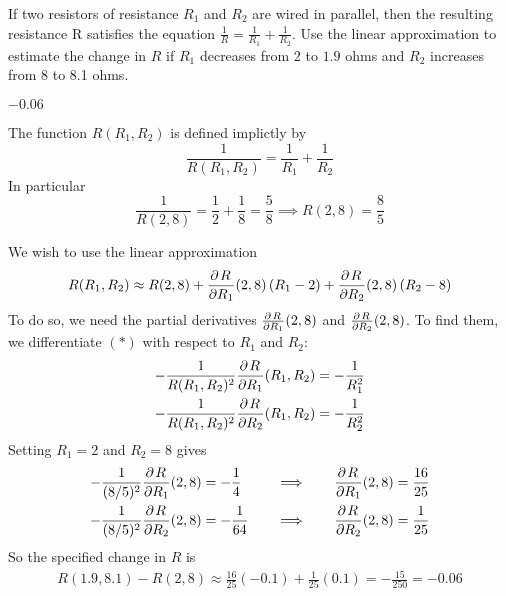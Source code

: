 \begin{question}[M200 2006A] %
If two resistors of resistance $R_1$ and $R_2$ are wired in parallel, 
then the resulting resistance R satisfies the equation
$\frac{1}{R} =\frac{1}{R_1}+\frac{1}{R_2}$. Use the linear
approximation to estimate the change in $R$ if $R_1$ decreases from 
$2$ to $1.9$ ohms and $R_2$ increases from 8 to 8.1 ohms.
\end{question}

%

\begin{answer}
$-0.06$
\end{answer}

\begin{solution}
The function $R(R_1,R_2)$ is defined implictly by
\begin{equation*}
\frac{1}{R(R_1,R_2)} =\frac{1}{R_1}+\frac{1}{R_2}
\tag{$*$}\end{equation*}
In particular
\begin{equation*}
\frac{1}{R(2,8)} = \frac{1}{2}+\frac{1}{8} = \frac{5}{8}
\implies R(2,8) = \frac{8}{5}
\end{equation*}

We wish to use the linear approximation
\begin{equation*}
R(R_1,R_2) \approx R(2,8) + \pdiff{R}{R_1}(2,8)\,(R_1-2)
                          + \pdiff{R}{R_2}(2,8)\,(R_2-8)
\end{equation*}
To do so, we need the partial derivatives $\pdiff{R}{R_1}(2,8)$
and $\pdiff{R}{R_2}(2,8)$. To find them, we differentiate $(*)$ with respect to
$R_1$ and $R_2$:
\begin{align*}
-\frac{1}{R(R_1,R_2)^2}\pdiff{R}{R_1}(R_1,R_2)
                 &= -\frac{1}{R_1^2}  \\
-\frac{1}{R(R_1,R_2)^2}\pdiff{R}{R_2}(R_1,R_2)
                 &= -\frac{1}{R_2^2}  \\
\end{align*}
Setting $R_1=2$ and $R_2=8$ gives
\begin{alignat*}{5}
-\frac{1}{(8/5)^2}\pdiff{R}{R_1}(2,8)
                 &= -\frac{1}{4} &\quad\implies\quad &
         &\pdiff{R}{R_1}(2,8) &=\frac{16}{25} \\
-\frac{1}{(8/5)^2}\pdiff{R}{R_2}(2,8)
                 &= -\frac{1}{64}  &\quad\implies\quad &
         &\pdiff{R}{R_2}(2,8) &=\frac{1}{25}
\end{alignat*}
So the specified change in $R$ is
\begin{align*}
R(1.9,8.1)-R(2,8) \approx  \frac{16}{25} (-0.1) + \frac{1}{25}(0.1)
=-\frac{15}{250} = -0.06
\end{align*}
\end{solution}

